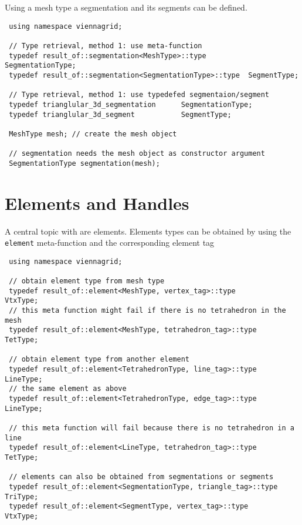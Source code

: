 Using a mesh type a segmentation and its segments can be defined.

\begin{lstlisting}
 using namespace viennagrid;

 // Type retrieval, method 1: use meta-function
 typedef result_of::segmentation<MeshType>::type        SegmentationType;
 typedef result_of::segmentation<SegmentationType>::type  SegmentType;

 // Type retrieval, method 1: use typedefed segmentaion/segment
 typedef trianglular_3d_segmentation      SegmentationType;
 typedef trianglular_3d_segment           SegmentType;

 MeshType mesh; // create the mesh object

 // segmentation needs the mesh object as constructor argument
 SegmentationType segmentation(mesh);
\end{lstlisting}

\pagebreak

\section{Elements and Handles} \label{sec:elements-and-handles}

A central topic with {\ViennaGrid} are elements. Elements types can be obtained by using the \lstinline|element| meta-function and the corresponding element tag

\begin{lstlisting}
 using namespace viennagrid;

 // obtain element type from mesh type
 typedef result_of::element<MeshType, vertex_tag>::type         VtxType;
 // this meta function might fail if there is no tetrahedron in the mesh
 typedef result_of::element<MeshType, tetrahedron_tag>::type    TetType;

 // obtain element type from another element
 typedef result_of::element<TetrahedronType, line_tag>::type      LineType;
 // the same element as above
 typedef result_of::element<TetrahedronType, edge_tag>::type      LineType;

 // this meta function will fail because there is no tetrahedron in a line
 typedef result_of::element<LineType, tetrahedron_tag>::type      TetType;

 // elements can also be obtained from segmentations or segments
 typedef result_of::element<SegmentationType, triangle_tag>::type TriType;
 typedef result_of::element<SegmentType, vertex_tag>::type        VtxType;
\end{lstlisting}

